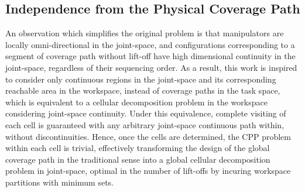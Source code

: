 \documentclass[journal]{IEEEtran}
\begin{document}

\subsection{Independence from the Physical Coverage Path}
An observation which simplifies the original problem is that manipulators are locally omni-directional in the joint-space, and configurations corresponding to a segment of coverage path without lift-off have high dimensional continuity in the joint-space, regardless of their sequencing order. 
As a result, this work is inspired to consider only continuous regions in the joint-space and its corresponding reachable area in the workspace, instead of coverage paths in the task space, which is equivalent to a cellular decomposition problem in the workspace considering joint-space continuity. Under this equivalence, complete visiting of each cell is guaranteed with any arbitrary joint-space continuous path within, without discontinuities. 
Hence, once the cells are determined, the CPP problem within each cell 
is trivial, effectively transforming the design of the global coverage path in the traditional sense into a global cellular decomposition problem in joint-space, optimal in the number of lift-offs by incuring workspace partitions with minimum sets.
 
\end{document}
